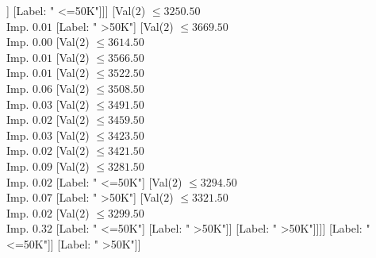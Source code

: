 \documentclass[margin=10pt]{standalone}
\begin{document}
\begin{forest}
																								[Val($2$) $ \leq 3223.50$ \\ Imp. $0.01$
																									[Val($2$) $ \leq 3189.50$ \\ Imp. $0.07$
																										[Label: " <=50K"]
																										[Val($2$) $ \leq 3210.50$ \\ Imp. $0.01$
																											[Val($2$) $ \leq 3207.50$ \\ Imp. $0.19$
																												[Label: " <=50K"]
																												[Label: " >50K"]]
																											[Label: " <=50K"]]]
																									[Val($2$) $ \leq 3250.50$ \\ Imp. $0.01$
																										[Label: " >50K"]
																										[Val($2$) $ \leq 3669.50$ \\ Imp. $0.00$
																											[Val($2$) $ \leq 3614.50$ \\ Imp. $0.01$
																												[Val($2$) $ \leq 3566.50$ \\ Imp. $0.01$
																													[Val($2$) $ \leq 3522.50$ \\ Imp. $0.06$
																														[Val($2$) $ \leq 3508.50$ \\ Imp. $0.03$
																															[Val($2$) $ \leq 3491.50$ \\ Imp. $0.02$
																																[Val($2$) $ \leq 3459.50$ \\ Imp. $0.03$
																																	[Val($2$) $ \leq 3423.50$ \\ Imp. $0.02$
																																		[Val($2$) $ \leq 3421.50$ \\ Imp. $0.09$
																																			[Val($2$) $ \leq 3281.50$ \\ Imp. $0.02$
																																				[Label: " <=50K"]
																																				[Val($2$) $ \leq 3294.50$ \\ Imp. $0.07$
																																					[Label: " >50K"]
																																					[Val($2$) $ \leq 3321.50$ \\ Imp. $0.02$
																																						[Val($2$) $ \leq 3299.50$ \\ Imp. $0.32$
																																							[Label: " <=50K"]
																																							[Label: " >50K"]]
																																						[Label: " >50K"]]]]
																																			[Label: " <=50K"]]
																																		[Label: " >50K"]]

\end{forest}
\end{document}

